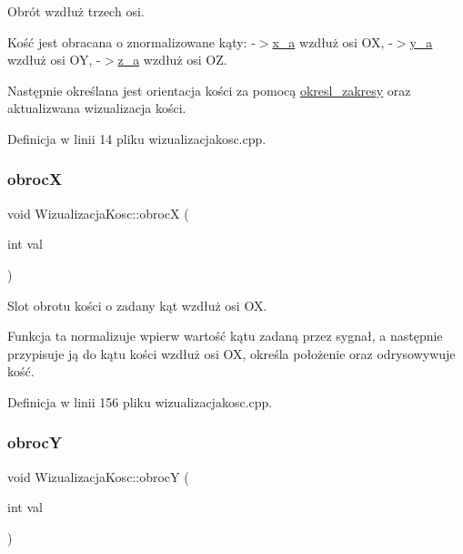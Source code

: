 Obrót wzdłuż trzech osi. 

Kość jest obracana o znormalizowane kąty\+: -\/$>$\hyperlink{}{x\+\_\+a} wzdłuż osi OX, -\/$>$\hyperlink{}{y\+\_\+a} wzdłuż osi OY, -\/$>$\hyperlink{}{z\+\_\+a} wzdłuż osi OZ.

Następnie określana jest orientacja kości za pomocą \hyperlink{class_wizualizacja_kosc_af65c8f14882161876dad59a3d0e754c2}{okresl\+\_\+zakresy} oraz aktualizwana wizualizacja kości. 

Definicja w linii 14 pliku wizualizacjakosc.\+cpp.

\mbox{\label{class_wizualizacja_kosc_acc8ddbf71bdee742b882390c73536b83}} 
\subsubsection{\texorpdfstring{obrocX}{obrocX}}
{\footnotesize\ttfamily void Wizualizacja\+Kosc\+::obrocX (\begin{DoxyParamCaption}\item[{int}]{val }\end{DoxyParamCaption})\hspace{0.3cm}{\ttfamily [slot]}}



Slot obrotu kości o zadany kąt wzdłuż osi OX. 

Funkcja ta normalizuje wpierw wartość kątu zadaną przez sygnał, a następnie przypisuje ją do kątu kości wzdłuż osi OX, określa położenie oraz odrysowywuje kość. 

Definicja w linii 156 pliku wizualizacjakosc.\+cpp.

\mbox{\label{class_wizualizacja_kosc_a05112c1b2321cc7ce5fc4123263ede7a}} 
\subsubsection{\texorpdfstring{obrocY}{obrocY}}
{\footnotesize\ttfamily void Wizualizacja\+Kosc\+::obrocY (\begin{DoxyParamCaption}\item[{int}]{val }\end{DoxyParamCaption})\hspace{0.3cm}{\ttfamily [slot]}}



